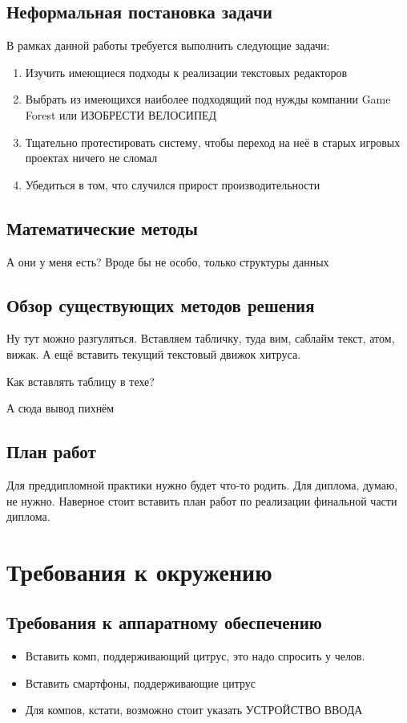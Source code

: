 \documentclass{fefu}
\begin{document}
	\subsection{Неформальная постановка задачи}
	В рамках данной работы требуется выполнить следующие задачи:
	\begin{enumerate}
		\item Изучить имеющиеся подходы к реализации текстовых редакторов
		\item Выбрать из имеющихся наиболее подходящий под нужды компании Game Forest или ИЗОБРЕСТИ ВЕЛОСИПЕД
		\item Тщательно протестировать систему, чтобы переход на неё в старых игровых проектах ничего не сломал
		\item Убедиться в том, что случился прирост производительности
	\end{enumerate}
	\subsection{Математические методы}
	А они у меня есть? Вроде бы не особо, только структуры данных	
	\subsection{Обзор существующих методов решения}
	\par Ну тут можно разгуляться. Вставляем табличку, туда вим, саблайм текст, атом, вижак. А ещё вставить текущий текстовый движок хитруса.
	\par Как вставлять таблицу в техе?	
	\par А сюда вывод пихнём
	\subsection{План работ}
	\par Для преддипломной практики нужно будет что-то родить. Для диплома, думаю, не нужно. Наверное стоит вставить план работ по реализации финальной части диплома.
	
	\section{Требования к окружению}
	\subsection{Требования к аппаратному обеспечению}
	\begin{itemize}
		\item Вставить комп, поддерживающий цитрус, это надо спросить у челов.
		\item Вставить смартфоны, поддерживающие цитрус
		\item Для компов, кстати, возможно стоит указать УСТРОЙСТВО ВВОДА
	\end{itemize}
\end{document}
